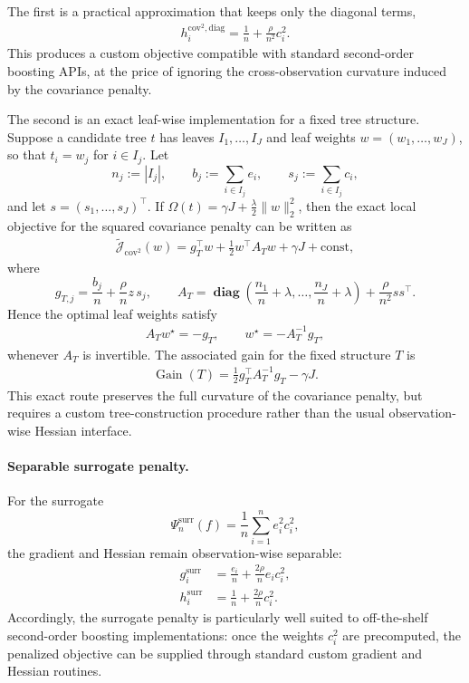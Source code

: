 \documentclass[12pt, draft]{article}
\theoremstyle{plain}
\theoremstyle{definition}
\newcommand{\1}{\mathbf{1}}
\newcommand{\diag}{\mathbf{\operatorname{diag}}}
\begin{document}
The first is a practical approximation that keeps only the diagonal terms,
\begin{align}
    \label{eq:boosting_cov2_diag_hessian}
    h_i^{\mathrm{cov}^2,\mathrm{diag}}
    =
    \frac{1}{n}
    +
    \frac{\rho}{n^2}c_i^2.
\end{align}
This produces a custom objective compatible with standard second-order boosting APIs, at the price of ignoring the cross-observation curvature induced by the covariance penalty.

The second is an exact leaf-wise implementation for a fixed tree structure. Suppose a candidate tree \(t\) has leaves \(I_1,\dots,I_J\) and leaf weights \(w=(w_1,\dots,w_J)\), so that \(t_i=w_j\) for \(i\in I_j\). Let
\[
n_j := |I_j|,
\qquad
b_j := \sum_{i\in I_j} e_i,
\qquad
s_j := \sum_{i\in I_j} c_i,
\]
and let \(s=(s_1,\dots,s_J)^\top\). If \(\Omega(t)=\gamma J + \frac{\lambda}{2}\|w\|_2^2\), then the exact local objective for the squared covariance penalty can be written as
\begin{align}
    \label{eq:boosting_cov2_exact_leaf_objective}
    \widetilde{\mathcal J}_{\mathrm{cov}^2}(w)
    =
    g_T^\top w
    +
    \frac{1}{2}w^\top A_T w
    +
    \gamma J
    + \text{const},
\end{align}
where
\[
g_{T,j}
=
\frac{b_j}{n}
+
\frac{\rho}{n}z\,s_j,
\qquad
A_T
=
\diag\!\left(\frac{n_1}{n}+\lambda,\dots,\frac{n_J}{n}+\lambda\right)
+
\frac{\rho}{n^2}ss^\top.
\]
Hence the optimal leaf weights satisfy
\begin{align}
    \label{eq:boosting_cov2_exact_leaf_system}
    A_T w^\star = -g_T,
    \qquad
    w^\star = -A_T^{-1}g_T,
\end{align}
whenever \(A_T\) is invertible. The associated gain for the fixed structure \(T\) is
\begin{align}
    \label{eq:boosting_cov2_exact_gain}
    \operatorname{Gain}(T)
    =
    \frac{1}{2}g_T^\top A_T^{-1}g_T - \gamma J.
\end{align}
This exact route preserves the full curvature of the covariance penalty, but requires a custom tree-construction procedure rather than the usual observation-wise Hessian interface.

\paragraph{Separable surrogate penalty.}
For the surrogate
\[
\Psi_n^{\mathrm{surr}}(f)
=
\frac{1}{n}\sum_{i=1}^n e_i^2 c_i^2,
\]
the gradient and Hessian remain observation-wise separable:
\begin{align}
    \label{eq:boosting_surr_grad_hess}
    g_i^{\mathrm{surr}}
    &=
    \frac{e_i}{n}
    +
    \frac{2\rho}{n}e_i c_i^2,
    \\
    h_i^{\mathrm{surr}}
    &=
    \frac{1}{n}
    +
    \frac{2\rho}{n}c_i^2.
\end{align}
Accordingly, the surrogate penalty is particularly well suited to off-the-shelf second-order boosting implementations: once the weights \(c_i^2\) are precomputed, the penalized objective can be supplied through standard custom gradient and Hessian routines.
\end{document}
